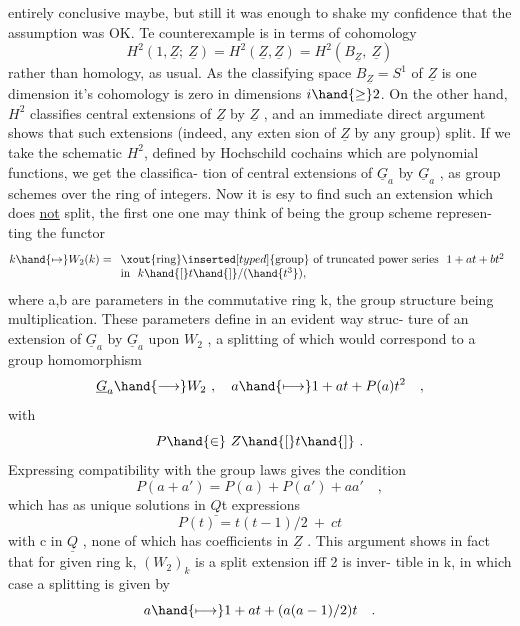 entirely conclusive maybe,  but still it was enough to shake my confidence
that the assumption was OK.  Te counterexample is in terms of cohomology
\[ H^2(1,\underline{Z};\ \underline{Z}) = H^2(\underline{Z},\underline{Z}) = H^2(B_{\underline{Z}},\ \underline{Z}) \]
rather than homology, as usual.   As the classifying space $B_{\underline{Z}} = S^1$ of $\underline{Z}$
is one dimension it's cohomology is zero in dimensions $i \hand{\geq} 2$.  On the 
other hand,  $H^2$ classifies central extensions of $\underline{Z}$ by $\underline{Z}$ ,  and an
immediate direct argument shows  that such extensions (indeed, any exten%
\hand{-}sion of $\underline{Z}$ by any group) split.  If we take the schematic $H^2$,  defined by
Hochschild cochains which are polynomial functions,  we get the classifica-%
tion of central extensions of $\underline{G}_a$ by $\underline{G}_a$  ,  as group schemes over
the ring of integers.  Now it is esy to find such an extension which does
\uline{not} split,  the first one one may think of being the group scheme represen-%
ting the functor
\[ k \hand{\mapsto} W_2(k) = \begin{array}[t]{l} \xout{\text{ring}}\inserted[typed]{\text{group}}\text{ of truncated power series }\ 1+at+bt^2 \\ \text{in }\ k\hand{[}t\hand{]}/(\hand{t^3}), \end{array} \]
where a,b are parameters in the commutative ring k,  the group structure
being multiplication.  These parameters define in an evident way  struc-%
ture of an extension of $\underline{G}_a$ by $\underline{G}_a$ upon $W_2$ ,  a splitting of which would
correspond to a group homomorphism
\[ \underline{G}_a \hand{\longrightarrow} W_2 \ , \quad a \hand{\longmapsto} 1 + at + P(a)t^2 \quad , \]
with
\[ P \hand{\in}\ Z\hand{[}t\hand{]} \ . \]
Expressing compatibility with the group laws gives the condition
\[ P(a+a') = P(a) + P(a') + aa' \quad , \]
which has\hand{,} as unique solutions  in  $\underline{Q}$\hand{$[$}t\hand{$]$}\hand{,} expressions
\[ P(t) = t(t-1)/2 \ + \ ct \]
with c in $\underline{Q}$ ,  none of which has coefficients in $\underline{Z}$ . \deleted{\unsure{(}}This argument shows
in fact that for given ring k, $(W_2)_k$ is a split extension iff 2 is inver-%
tible in k,  in which case a splitting is given by
\[ a \hand{\longmapsto} 1 + at +(a(a-1)/2)t \quad . \]

